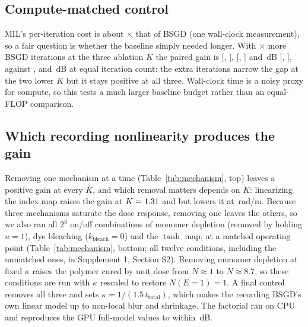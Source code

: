 \documentclass{optica-article}
\begin{document}
\subsection{Compute-matched control}
\label{sec:compute-matched}
MIL's per-iteration cost is about \ComputeMatchRatio$\times$ that of BSGD (one
wall-clock measurement), so a fair question is whether the baseline simply
needed longer. With \ComputeMatchRatio$\times$ more BSGD iterations at the
three ablation $K$ the paired gain is \MTwoRGainSub{} [\MTwoRLoSub,
\MTwoRHiSub], \MTwoRGainNear{} [\MTwoRLoNear, \MTwoRHiNear] and
\MTwoRGainPost\,dB [\MTwoRLoPost, \MTwoRHiPost], against \SOneGBaselineSub,
\SOneGBaselineNear{} and \SOneGBaselinePost\,dB at equal iteration count: the
extra iterations narrow the gap at the two lower $K$ but it stays positive at
all three. Wall-clock time is a noisy proxy for compute, so this tests a much
larger baseline budget rather than an equal-FLOP comparison.

\subsection{Which recording nonlinearity produces the gain}
\label{sec:mechanism}
Removing one mechanism at a time (Table~\ref{tab:mechanism}, top) leaves a
positive gain at every $K$, and which removal matters depends on $K$:
linearizing the index map raises the gain at $K=1.31$ and \SOneKPost{}
but lowers it at \SOneKNear\,rad/\textmu m. Because three mechanisms saturate
the dose response, removing one leaves the others, so we also ran all $2^3$
on/off combinations of monomer depletion (removed by holding $u=1$), dye
bleaching ($k_{\text{bleach}}=0$) and the $\tanh$ map, at a matched operating
point (Table~\ref{tab:mechanism}, bottom; all twelve conditions, including the
unmatched ones, in Supplement 1, Section S2). Removing monomer depletion at
fixed $\kappa$ raises the polymer cured by unit dose from $N\approx1$ to
$N\approx8.7$, so these conditions are run with $\kappa$ rescaled to restore
$N(E{=}1)=1$. A final control removes all three and sets
$\kappa=1/(1.5\,t_{\text{total}})$, which makes the recording BSGD's own linear
model up to non-local blur and shrinkage. The factorial ran on CPU and
reproduces the GPU full-model values to within \SXDeviceMaxDiff\,dB.
\end{document}
